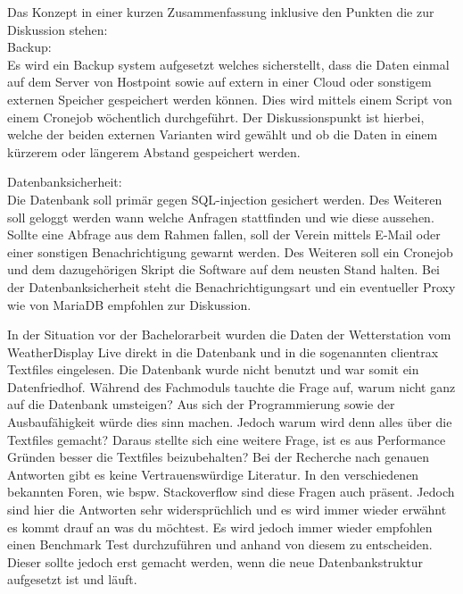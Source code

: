 
Das Konzept in einer kurzen Zusammenfassung inklusive den Punkten die zur Diskussion stehen:\\
Backup:\\
Es wird ein Backup system aufgesetzt welches sicherstellt, dass die Daten einmal auf dem Server von Hostpoint sowie auf extern in einer Cloud oder sonstigem externen Speicher gespeichert werden können. Dies wird mittels einem Script von einem Cronejob wöchentlich durchgeführt. Der Diskussionspunkt ist hierbei, welche der beiden externen Varianten wird gewählt und ob die Daten in einem kürzerem oder längerem Abstand gespeichert werden.

Datenbanksicherheit:\\
Die Datenbank soll primär gegen SQL-injection gesichert werden. Des Weiteren soll geloggt werden wann welche Anfragen stattfinden und wie diese aussehen. Sollte eine Abfrage aus dem Rahmen fallen, soll der Verein mittels E-Mail oder einer sonstigen Benachrichtigung gewarnt werden. Des Weiteren soll ein Cronejob und dem dazugehörigen Skript die Software auf dem neusten Stand halten. Bei der Datenbanksicherheit steht die Benachrichtigungsart und ein eventueller Proxy wie von MariaDB empfohlen zur Diskussion. 

In der Situation vor der Bachelorarbeit wurden die Daten der Wetterstation vom WeatherDisplay Live direkt in die Datenbank und in die sogenannten clientrax Textfiles eingelesen. Die Datenbank wurde nicht benutzt und war somit ein Datenfriedhof. Während des Fachmoduls tauchte die Frage auf, warum nicht ganz auf die Datenbank umsteigen? Aus sich der Programmierung sowie der Ausbaufähigkeit würde dies sinn machen. Jedoch warum wird denn alles über die Textfiles gemacht? Daraus stellte sich eine weitere Frage, ist es aus Performance Gründen besser die Textfiles beizubehalten?  Bei der Recherche nach genauen Antworten gibt es keine Vertrauenswürdige Literatur. In den verschiedenen bekannten Foren, wie bspw. Stackoverflow sind diese Fragen auch präsent. Jedoch sind hier die Antworten sehr widersprüchlich und es wird immer wieder erwähnt es kommt drauf an was du möchtest. Es wird jedoch immer wieder empfohlen einen Benchmark Test durchzuführen und anhand von diesem zu entscheiden. Dieser sollte jedoch erst gemacht werden, wenn die neue Datenbankstruktur aufgesetzt ist und läuft. 
